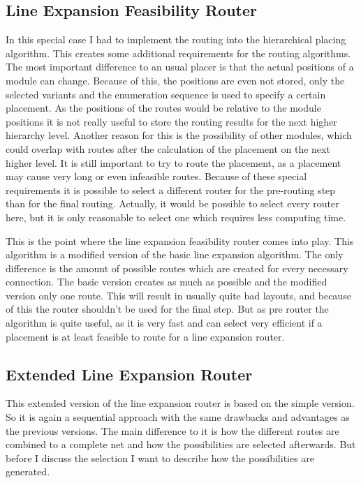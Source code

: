 \subsection{Line Expansion Feasibility Router}
In this special case I had to implement the routing into the hierarchical placing algorithm. This creates some additional requirements for the routing algorithms. The most important difference to an usual placer is that the actual positions of a module can change. Because of this, the positions are even not stored, only the selected variants and the enumeration sequence is used to specify a certain placement. As the positions of the routes would be relative to the module positions it is not really useful to store the routing results for the next higher hierarchy level. Another reason for this is the possibility of other modules, which could overlap with routes after the calculation of the placement on the next higher level. It is still important to try to route the placement, as a placement may cause very long or even infeasible routes. Because of these special requirements it is possible to select a different router for the pre-routing step than for the final routing. Actually, it would be possible to select every router here, but it is only reasonable to select one which requires less computing time.

This is the point where the line expansion feasibility router comes into play. This algorithm is a modified version of the basic line expansion algorithm. The only difference  is the amount of possible routes which are created for every necessary connection. The basic version creates as much as possible and the modified version only one route. This will result in usually quite bad layouts, and because of this the router shouldn't be used for the final step. But as pre router the algorithm is quite useful, as it is very fast and can select very efficient if a placement is at least feasible to route for a line expansion router.

\subsection{Extended Line Expansion Router}
This extended version of the line expansion router is based on the simple version. So it is again a sequential approach with the same drawbacks and advantages as the previous versions. The main difference to it is how the different routes are combined to a complete net and how the possibilities are selected afterwards. But before I discuss the selection I want to describe how the possibilities are generated.

